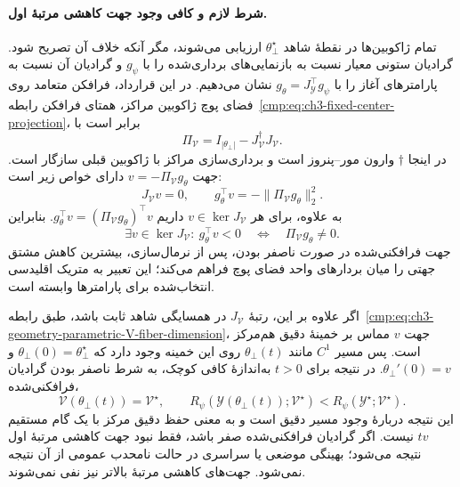 \paragraph{شرط لازم و کافی وجود جهت کاهشی مرتبهٔ اول.}
تمام ژاکوبین‌ها در نقطهٔ شاهد $\theta_\bot^\star$ ارزیابی می‌شوند، مگر آنکه خلاف آن تصریح شود. گرادیان ستونی معیار نسبت به بازنمایی‌های برداری‌شده را با $g_\psi$ و گرادیان آن نسبت به پارامترهای آغاز را با $g_\theta=J_{\mathscr Y}^{\top}g_\psi$ نشان می‌دهیم. در این قرارداد، فرافکن متعامد روی فضای پوچ ژاکوبین مراکز، همتای فرافکن رابطه~\eqref{cmp:eq:ch3-fixed-center-projection}، برابر است با
\begin{equation}\label{cmp:eq:ch3-geometry-parametric-center-projector}
\Pi_{\mathcal V}
=I_{|\theta_\bot|}-J_{\mathcal V}^{\dagger}J_{\mathcal V}.
\end{equation}
در اینجا $\dagger$ وارون مور--پنروز است و برداری‌سازی مراکز با ژاکوبین قبلی سازگار است. جهت $v=-\Pi_{\mathcal V}g_\theta$ دارای خواص زیر است:
\begin{equation}\label{cmp:eq:ch3-geometry-parametric-R-descent}
J_{\mathcal V}v=0,\qquad
g_\theta^\top v=-\|\Pi_{\mathcal V}g_\theta\|_2^2.
\end{equation}
به علاوه، برای هر $v\in\ker J_{\mathcal V}$ داریم $g_\theta^\top v=(\Pi_{\mathcal V}g_\theta)^\top v$. بنابراین
\begin{equation}\label{cmp:eq:ch3-geometry-parametric-R-descent-iff}
\exists v\in\ker J_{\mathcal V}:\ g_\theta^\top v<0
\quad\Longleftrightarrow\quad
\Pi_{\mathcal V}g_\theta\ne0.
\end{equation}
جهت فرافکنی‌شده در صورت ناصفر بودن، پس از نرمال‌سازی، بیشترین کاهش مشتق جهتی را میان بردارهای واحد فضای پوچ فراهم می‌کند؛ این تعبیر به متریک اقلیدسی انتخاب‌شده برای پارامترها وابسته است.

اگر علاوه بر این، رتبهٔ $J_{\mathcal V}$ در همسایگی شاهد ثابت باشد، طبق رابطه~\eqref{cmp:eq:ch3-geometry-parametric-V-fiber-dimension}، جهت $v$ مماس بر خمینهٔ دقیق هم‌مرکز است. پس مسیر $C^1$ مانند $\theta_\bot(t)$ روی این خمینه وجود دارد که $\theta_\bot(0)=\theta_\bot^\star$ و $\theta_\bot'(0)=v$. در نتیجه برای $t>0$ به‌اندازهٔ کافی کوچک، به شرط ناصفر بودن گرادیان فرافکنی‌شده،
\begin{equation}\label{cmp:eq:ch3-geometry-parametric-exact-R-improvement}
\mathcal V(\theta_\bot(t))=\mathcal V^\star,\qquad
R_\psi(\mathscr Y(\theta_\bot(t));\mathcal V^\star)
<R_\psi(\mathscr Y^\star;\mathcal V^\star).
\end{equation}
این نتیجه دربارهٔ وجود مسیر دقیق است و به معنی حفظ دقیق مرکز با یک گام مستقیم $t v$ نیست. اگر گرادیان فرافکنی‌شده صفر باشد، فقط نبود جهت کاهشی مرتبهٔ اول نتیجه می‌شود؛ بهینگی موضعی یا سراسری در حالت نامحدب عمومی از آن نتیجه نمی‌شود. جهت‌های کاهشی مرتبهٔ بالاتر نیز نفی نمی‌شوند.

